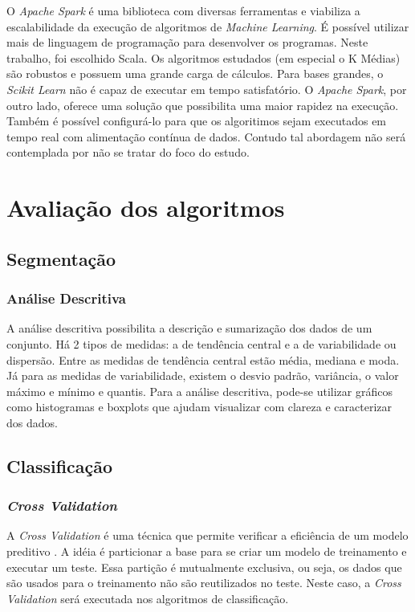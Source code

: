 O \emph{Apache Spark} é uma biblioteca com diversas ferramentas e viabiliza a escalabilidade da execução de algoritmos de \emph{Machine Learning}. É possível utilizar mais de linguagem de programação para desenvolver os programas. Neste trabalho, foi escolhido Scala.
Os algoritmos estudados (em especial o K Médias) são robustos e possuem uma grande carga de cálculos. Para bases grandes, o \emph{Scikit Learn} não é capaz de executar em tempo satisfatório. O \emph{Apache Spark}, por outro lado, oferece uma solução que possibilita uma maior rapidez na execução. Também é possível configurá-lo para que os algoritimos sejam executados em tempo real com alimentação contínua de dados. Contudo tal abordagem não será contemplada por não se tratar do foco do estudo.

\section{Avaliação dos algoritmos}

\subsection{Segmentação}

\subsubsection{Análise Descritiva}
A análise descritiva possibilita a descrição e sumarização dos dados de um conjunto. Há 2 tipos de medidas: a de tendência central e a de variabilidade ou dispersão. Entre as medidas de tendência central estão média, mediana e moda. Já para as medidas de variabilidade, existem o desvio padrão, variância, o valor máximo e mínimo e quantis.
Para a análise descritiva, pode-se utilizar gráficos como histogramas e boxplots que ajudam visualizar com clareza e caracterizar dos dados.


\subsection{Classificação}

\subsubsection{\emph{Cross Validation}}

A \emph{Cross Validation} é uma técnica que permite verificar a eficiência de um modelo preditivo \cite[p. 241]{HASTIE}. A idéia é particionar a base para se criar um modelo de treinamento e executar um teste. Essa partição é mutualmente exclusiva, ou seja, os dados que são usados para o treinamento não são reutilizados no teste. Neste caso, a \emph{Cross Validation} será executada nos algoritmos de classificação.


